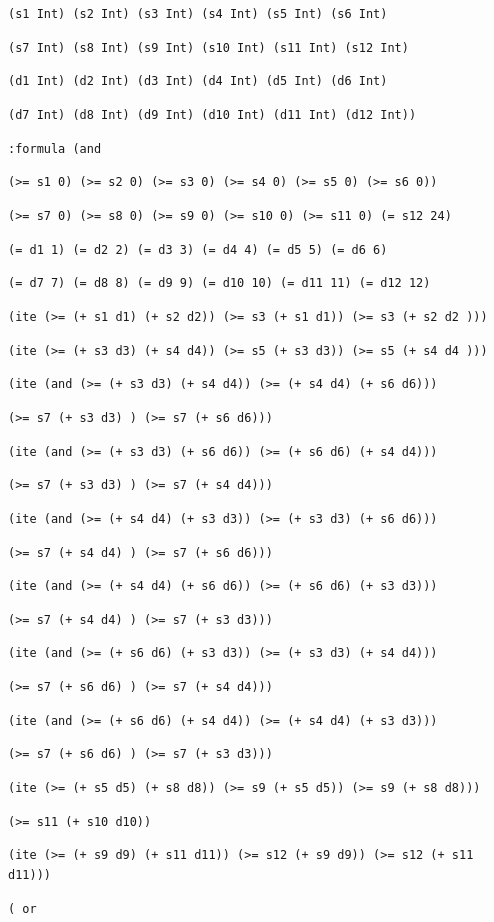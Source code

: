 \documentclass[11pt]{article}
\begin{document}
{{{{\tt (s1 Int) (s2 Int) (s3 Int) (s4 Int) (s5 Int) (s6 Int)}

{\tt (s7 Int) (s8 Int) (s9 Int) (s10 Int) (s11 Int) (s12 Int)}

{\tt (d1 Int) (d2 Int) (d3 Int) (d4 Int) (d5 Int) (d6 Int)}

{\tt (d7 Int) (d8 Int) (d9 Int) (d10 Int) (d11 Int) (d12 Int))}

{\tt :formula (and}

{\tt (>= s1 0) (>= s2 0) (>= s3 0) (>= s4 0) (>= s5 0) (>= s6 0))}

{\tt (>= s7 0) (>= s8 0) (>= s9 0) (>= s10 0) (>= s11 0) (= s12 24)}

{\tt (= d1 1) (= d2 2) (= d3 3) (= d4 4) (= d5 5) (= d6 6)}

{\tt (= d7 7) (= d8 8) (= d9 9) (= d10 10) (= d11 11) (= d12 12)}

{\tt (ite (>= (+ s1 d1) (+ s2 d2))  (>= s3 (+ s1 d1))  (>= s3 (+ s2 d2 )))}

{\tt (ite (>= (+ s3 d3) (+ s4 d4))  (>= s5 (+ s3 d3))  (>= s5 (+ s4 d4 )))}

{\tt (ite (and (>= (+ s3 d3) (+ s4 d4)) (>= (+ s4 d4) (+ s6 d6))) }

{\tt (>= s7 (+ s3 d3) ) (>= s7 (+ s6 d6)))}

{\tt (ite (and (>= (+ s3 d3) (+ s6 d6)) (>= (+ s6 d6) (+ s4 d4)))}

{\tt (>= s7 (+ s3 d3) ) (>= s7 (+ s4 d4)))}

{\tt (ite (and (>= (+ s4 d4) (+ s3 d3)) (>= (+ s3 d3) (+ s6 d6))) }

{\tt (>= s7 (+ s4 d4) ) (>= s7 (+ s6 d6)))}

{\tt (ite (and (>= (+ s4 d4) (+ s6 d6)) (>= (+ s6 d6) (+ s3 d3))) }

{\tt (>= s7 (+ s4 d4) ) (>= s7 (+ s3 d3)))}

{\tt (ite (and (>= (+ s6 d6) (+ s3 d3)) (>= (+ s3 d3) (+ s4 d4))) }

{\tt (>= s7 (+ s6 d6) ) (>= s7 (+ s4 d4)))}

{\tt (ite (and (>= (+ s6 d6) (+ s4 d4)) (>= (+ s4 d4) (+ s3 d3))) }

{\tt (>= s7 (+ s6 d6) ) (>= s7 (+ s3 d3)))}

{\tt (ite (>= (+ s5 d5) (+ s8 d8)) (>= s9 (+ s5 d5)) (>= s9 (+ s8 d8)))}

{\tt (>= s11 (+ s10 d10))}

{\tt (ite (>= (+ s9 d9) (+ s11 d11)) (>= s12 (+ s9 d9)) (>= s12 (+ s11 d11)))}

{\tt ( or}

}}}
\end{document}

